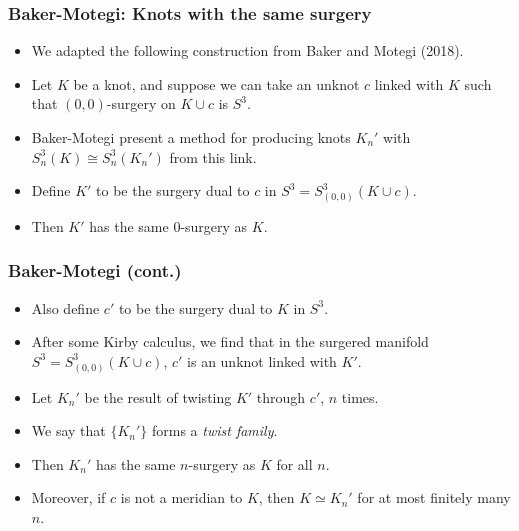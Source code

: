 \documentclass{beamer}
\theoremstyle{ex}
\theoremstyle{rem}
\begin{document}
	\begin{frame}
		\frametitle{Baker-Motegi: Knots with the same surgery}
			\begin{itemize}
				\item We adapted the following construction from Baker and Motegi (2018).
				
				\item Let $K$ be a knot, and suppose we can take an unknot $c$ linked with $K$ such that $(0,0)$-surgery on $K\cup c$ is $S^3$.
				
				\item Baker-Motegi present a method for producing knots $K_n'$ with $S^3_n(K)\cong S^3_n(K_n')$ from this link.
				
				\item Define $K'$ to be the surgery dual to $c$ in $S^3=S^3_{(0,0)}(K\cup c)$.
				
				\item Then $K'$ has the same 0-surgery as $K$.
				
			\end{itemize}
		
			
	
	\end{frame}

	\begin{frame}
		\frametitle{Baker-Motegi (cont.)}
		\begin{itemize}
			
			\item Also define $c'$ to be the surgery dual to $K$ in $S^3$.
			
			\item After some Kirby calculus, we find that in the surgered manifold $S^3=S^3_{(0,0)}(K\cup c)$, $c'$ is an unknot linked with $K'$.
			
			\item Let $K_n'$ be the result of twisting $K'$ through $c'$, $n$ times.
			
			\item We say that $\{K_n'\}$ forms a \textit{twist family}.
			
			\item Then $K_n'$ has the same $n$-surgery as $K$ for all $n$.
			
			\item Moreover, if $c$ is not a meridian to $K$, then $K\simeq K_n'$ for at most finitely many $n$.
		\end{itemize}
	\end{frame}
\end{document}
